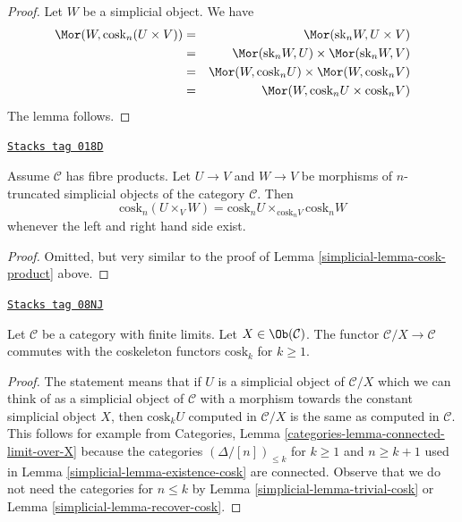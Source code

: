 \begin{proof}
Let $W$ be a simplicial object. We have
\begin{eqnarray*}
\Mor(W, \text{cosk}_n (U \times V))
& = &
\Mor(\text{sk}_n W, U \times V) \\
& = &
\Mor(\text{sk}_n W, U)
\times
\Mor(\text{sk}_nW, V) \\
& = &
\Mor(W, \text{cosk}_n U)
\times
\Mor(W, \text{cosk}_n V) \\
& = &
\Mor(W, \text{cosk}_n U \times \text{cosk}_n V)
\end{eqnarray*}
The lemma follows.
\end{proof}

\begin{lemma}
\label{simplicial-lemma-cosk-fibre-product}
\href{https://stacks.math.columbia.edu/tag/018D}{\texttt{Stacks tag 018D}}

Assume $\mathcal{C}$ has fibre products.
Let $U \to V$ and $W \to V$ be morphisms
of $n$-truncated simplicial objects of the
category $\mathcal{C}$. Then
$$
\text{cosk}_n (U \times_V W)
=
\text{cosk}_nU \times_{\text{cosk}_n V} \text{cosk}_nW
$$
whenever the left and right hand side exist.
\end{lemma}

\begin{proof}

Omitted, but very similar to the proof of
Lemma \ref{simplicial-lemma-cosk-product} above.
\end{proof}

\begin{lemma}
\label{simplicial-lemma-cosk-above-object}
\href{https://stacks.math.columbia.edu/tag/08NJ}{\texttt{Stacks tag 08NJ}}

Let $\mathcal{C}$ be a category with finite limits.
Let $X \in \Ob(\mathcal{C})$.
The functor $\mathcal{C}/X \to \mathcal{C}$ commutes with
the coskeleton functors $\text{cosk}_k$ for $k \geq 1$.
\end{lemma}

\begin{proof}

The statement means that if $U$ is a simplicial object of $\mathcal{C}/X$
which we can think of as a simplicial object of $\mathcal{C}$ with a morphism
towards the constant simplicial object $X$, then $\text{cosk}_k U$
computed in $\mathcal{C}/X$ is the same as computed in $\mathcal{C}$.
This follows for example from
Categories, Lemma \ref{categories-lemma-connected-limit-over-X}
because the categories $(\Delta/[n])_{\leq k}$ for $k \geq 1$ and
$n \geq k + 1$ used in Lemma \ref{simplicial-lemma-existence-cosk}
are connected. Observe that we do not need the categories
for $n \leq k$ by Lemma \ref{simplicial-lemma-trivial-cosk} or
Lemma \ref{simplicial-lemma-recover-cosk}.
\end{proof}

